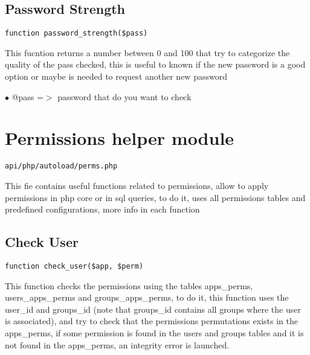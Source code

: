 \documentclass[a4paper]{book}
\begin{document}
\hypertarget{toc216}{}
\subsection{Password Strength}

\begin{lstlisting}
function password_strength($pass)
\end{lstlisting}

This fucntion returns a number between 0 and 100 that try to categorize
the quality of the pass checked, this is useful to known if the new
password is a good option or maybe is needed to request another new
password

\begin{compactitem}
\item[\color{myblue}$\bullet$] @pass =$>$ password that do you want to check
\end{compactitem}

\hypertarget{toc217}{}
\section{Permissions helper module}

\begin{lstlisting}
api/php/autoload/perms.php
\end{lstlisting}

This fie contains useful functions related to permissions, allow to apply permissions in php core
or in sql queries, to do it, uses all permissions tables and predefined configurations, more info
in each function

\hypertarget{toc218}{}
\subsection{Check User}

\begin{lstlisting}
function check_user($app, $perm)
\end{lstlisting}

This function checks the permissions using the tables apps\_perms,
users\_apps\_perms and groups\_apps\_perms, to do it, this function uses
the user\_id and groups\_id (note that groups\_id contains all groups
where the user is associated), and try to check that the permissions
permutations exists in the apps\_perms, if some permission is found
in the users and groups tables and it is not found in the apps\_perms,
an integrity error is launched.
\end{document}
